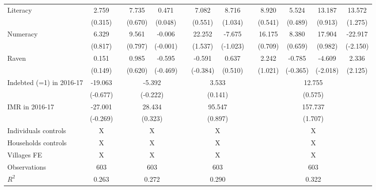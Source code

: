 \begin{table}[htbp]
{\begin{tabular}{lcccccccccccc}
    Literacy & 2.759 &       & 7.735 & 0.471 &       & 7.082 & 8.716 &       & 8.920 & 5.524 & 13.187 & 13.572 \\
          & (0.315) &       & (0.670) & (0.048) &       & (0.551) & (1.034) &       & (0.541) & (0.489) & (0.913) & (1.275) \\
    Numeracy & 6.329 &       & 9.561 & -0.006 &       & 22.252 & -7.675 &       & 16.175 & 8.380 & 17.904 & -22.917 \\
          & (0.817) &       & (0.797) & (-0.001) &       & (1.537) & (-1.023) &       & (0.709) & (0.659) & (0.982) & (-2.150) \\
    Raven & 0.151 &       & 0.985 & -0.595 &       & -0.591 & 0.637 &       & 2.242 & -0.785 & -4.609 & 2.336 \\
          & (0.149) &       & (0.620) & (-0.469) &       & (-0.384) & (0.510) &       & (1.021) & (-0.365) & (-2.018) & (2.125) \\
\cmidrule{1-2}\cmidrule{4-5}\cmidrule{7-8}\cmidrule{10-13}    Indebted (=1) in 2016-17 & -19.063 &       & \multicolumn{2}{c}{-5.392} &       & \multicolumn{2}{c}{3.533} &       & \multicolumn{4}{c}{12.755} \\
          & (-0.677) &       & \multicolumn{2}{c}{(-0.222)} &       & \multicolumn{2}{c}{(0.141)} &       & \multicolumn{4}{c}{(0.575)} \\
    IMR in 2016-17 & -27.001 &       & \multicolumn{2}{c}{28.434} &       & \multicolumn{2}{c}{95.547} &       & \multicolumn{4}{c}{157.737} \\
          & (-0.269) &       & \multicolumn{2}{c}{(0.323)} &       & \multicolumn{2}{c}{(0.897)} &       & \multicolumn{4}{c}{(1.707)} \\
    Individuals controls & X     &       & \multicolumn{2}{c}{X} &       & \multicolumn{2}{c}{X} &       & \multicolumn{4}{c}{X} \\
    Households controls & X     &       & \multicolumn{2}{c}{X} &       & \multicolumn{2}{c}{X} &       & \multicolumn{4}{c}{X} \\
    Villages FE & X     &       & \multicolumn{2}{c}{X} &       & \multicolumn{2}{c}{X} &       & \multicolumn{4}{c}{X} \\
    \midrule
    Observations & 603   &       & \multicolumn{2}{c}{603} &       & \multicolumn{2}{c}{603} &       & \multicolumn{4}{c}{603} \\
    $R^2$ & 0.263 &       & \multicolumn{2}{c}{0.272} &       & \multicolumn{2}{c}{0.290} &       & \multicolumn{4}{c}{0.322} \\

\end{tabular}}
\end{table}
